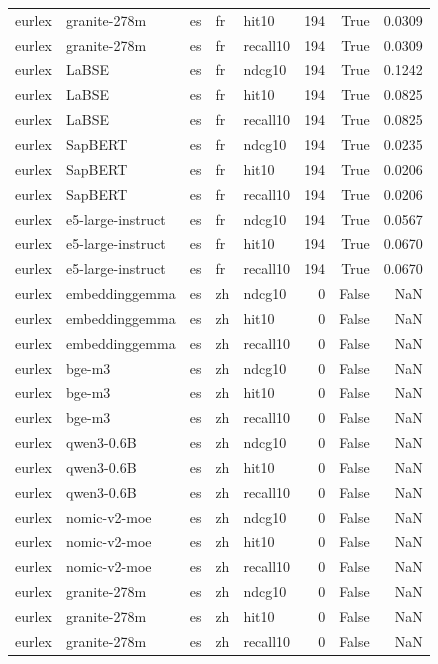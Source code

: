\begin{tabular}{lllllrrr}
eurlex & granite-278m & es & fr & hit10 & 194 & True & 0.0309 \\
eurlex & granite-278m & es & fr & recall10 & 194 & True & 0.0309 \\
eurlex & LaBSE & es & fr & ndcg10 & 194 & True & 0.1242 \\
eurlex & LaBSE & es & fr & hit10 & 194 & True & 0.0825 \\
eurlex & LaBSE & es & fr & recall10 & 194 & True & 0.0825 \\
eurlex & SapBERT & es & fr & ndcg10 & 194 & True & 0.0235 \\
eurlex & SapBERT & es & fr & hit10 & 194 & True & 0.0206 \\
eurlex & SapBERT & es & fr & recall10 & 194 & True & 0.0206 \\
eurlex & e5-large-instruct & es & fr & ndcg10 & 194 & True & 0.0567 \\
eurlex & e5-large-instruct & es & fr & hit10 & 194 & True & 0.0670 \\
eurlex & e5-large-instruct & es & fr & recall10 & 194 & True & 0.0670 \\
eurlex & embeddinggemma & es & zh & ndcg10 & 0 & False & NaN \\
eurlex & embeddinggemma & es & zh & hit10 & 0 & False & NaN \\
eurlex & embeddinggemma & es & zh & recall10 & 0 & False & NaN \\
eurlex & bge-m3 & es & zh & ndcg10 & 0 & False & NaN \\
eurlex & bge-m3 & es & zh & hit10 & 0 & False & NaN \\
eurlex & bge-m3 & es & zh & recall10 & 0 & False & NaN \\
eurlex & qwen3-0.6B & es & zh & ndcg10 & 0 & False & NaN \\
eurlex & qwen3-0.6B & es & zh & hit10 & 0 & False & NaN \\
eurlex & qwen3-0.6B & es & zh & recall10 & 0 & False & NaN \\
eurlex & nomic-v2-moe & es & zh & ndcg10 & 0 & False & NaN \\
eurlex & nomic-v2-moe & es & zh & hit10 & 0 & False & NaN \\
eurlex & nomic-v2-moe & es & zh & recall10 & 0 & False & NaN \\
eurlex & granite-278m & es & zh & ndcg10 & 0 & False & NaN \\
eurlex & granite-278m & es & zh & hit10 & 0 & False & NaN \\
eurlex & granite-278m & es & zh & recall10 & 0 & False & NaN \\

\end{tabular}
